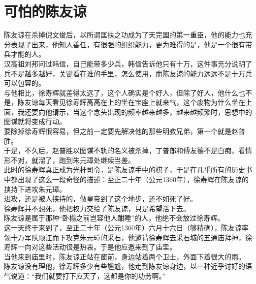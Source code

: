 \section{可怕的陈友谅}
\ifnum{}
	\begin{multicols}{\theparacolNo}
\fi
陈友谅在杀掉倪文俊后，以所谓匡扶之功成为了天完国的第一重臣，他的能力也充分表现了出来，他知人善任，有很强的组织能力，更为难得的是，他是一个很有带兵才能的人。\\

汉高祖刘邦问过韩信，自己能带多少兵，韩信告诉他只有十万，这件事充分说明了兵不是越多越好，关键看在谁的手里，怎么使用，而陈友谅的能力远远不是十万兵可以包容的。\\

与他相比，徐寿辉就差得太远了，这个人确实是个好人，但除了好人，他什么也不是，陈友谅每天看见徐寿辉高高在上的坐在宝座上就来气，这个废物为什么坐在上面，我还要向他请示，当这个念头出现的频率越来越多，越来越频繁时，思想中的图谋就将变成行动。\\

要除掉徐寿辉很容易，但之前一定要先解决他的那些明教兄弟，第一个就是赵普胜。\\

于是，不久后，赵普胜以图谋不轨的名义被杀掉，丁普郎和傅友德不是白痴，看情形不对，就溜了，跑到朱元璋处继续当差。\\

此时的徐寿辉真正成为光杆司令，是陈友谅手中的棋子，于是在几乎所有的历史书中都出现了这么一段奇怪的描述：至正二十年（公元1360年），徐寿辉在陈友谅的挟持下进攻朱元璋。\\

进攻，还是被人挟持的，做皇帝到了这个地步，还不如死了好。\\

徐寿辉并不想死，他把权力交给了陈友谅，只是希望活下去。\\

陈友谅是属于那种“卧榻之前岂容他人酣睡”的人，他绝不会放过徐寿辉。\\

这一天终于来到了，至正二十年（公元1360年）六月十六日（够精确），陈友谅率领十万军队顺江而下攻克朱元璋的采石，他邀请徐寿辉去采石城的五通庙拜神，徐寿辉一向对这些活动很是热衷。于是他应邀来到了庙里。\\

当他来到庙里时，陈友谅正站在窗前，身边站着两个卫士，外面下着很大的雨。\\

陈友谅没有理他，徐寿辉多少有些尴尬，他走到陈友谅身边，以一种近乎讨好的语气说道：“我们就要打下应天了，这都是你的功劳啊。”\\


\end{multicols}
